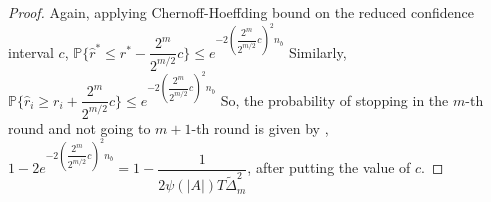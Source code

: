 \begin{proof}
\newline
Again, applying Chernoff-Hoeffding bound on the reduced confidence interval $c$,
\newline
\hspace*{8em}$\mathbb{P}\lbrace\hat{r}^{*}\leq r^{*} - \dfrac{2^{m}}{2^{m/2}}c \rbrace \leq e^{-2(\dfrac{2^{m}}{2^{m/2}}c)^2 n_{b}}$
\newline
Similarly, $\mathbb{P}\lbrace\hat{r}_{i}\geq r_{i} + \dfrac{2^{m}}{2^{m/2}}c \rbrace \leq e^{-2(\dfrac{2^{m}}{2^{m/2}}c)^2 n_{b}}$
\newline
So, the probability of stopping in the $m$-th round and not going to $m+1$-th round is given by
,\newline
\hspace*{8em}$1-2e^{-2(\dfrac{2^{m}}{2^{m/2}}c)^{2} n_{b}} = 1-\dfrac{1}{2\psi(|A|)T\tilde{\Delta}_{m}^{2}}$, after putting the value of $c$.
\end{proof}

